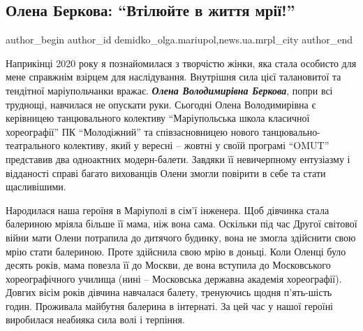  
 
 
 
 
 
\subsection{Олена Беркова: \enquote{Втілюйте в життя мрії!}}
\label{sec:31_12_2020.stz.news.ua.mrpl_city.1.olena_berkova_mrii}
 
\ifcmt
 author_begin
   author_id demidko_olga.mariupol,news.ua.mrpl_city
 author_end
\fi


Наприкінці 2020 року я познайомилася з творчістю жінки, яка стала особисто для
мене справжнім взірцем для наслідування. Внутрішня сила цієї талановитої та
тендітної маріупольчанки вражає. \emph{\textbf{Олена Володимирівна Беркова}}, попри всі
труднощі, навчилася не опускати руки. Сьогодні Олена Володимирівна є керівницею
танцювального колективу \enquote{Маріупольська школа класичної хореографії} ПК
\enquote{Молодіжний} та співзасновницею нового танцювально-театрального колективу, який
у вересні – жовтні у своїй програмі \enquote{OMUT} представив два одноактних
модерн-балети. Завдяки її невичерпному ентузіазму і відданості справі багато
вихованців Олени змогли повірити в себе та стати щасливішими.

Народилася наша героїня в Маріуполі в сім'ї інженера. Щоб дівчинка стала
балериною мріяла більше її мама, ніж вона сама. Оскільки під час Другої
світової війни мати Олени потрапила до дитячого будинку, вона не змогла
здійснити свою мрію стати балериною. Проте здійснила свою мрію в доньці. Коли
Оленці було десять років, мама повезла її до Москви, де вона вступила до
Московського хореографічного училища (нині – Московська державна академія
хореографії). Довгих вісім років дівчина навчалася балету, тренуючись щодня
п'ять-шість годин. Проживала майбутня балерина в інтернаті. За цей час у нашої
героїні виробилася неабияка сила волі і терпіння.

